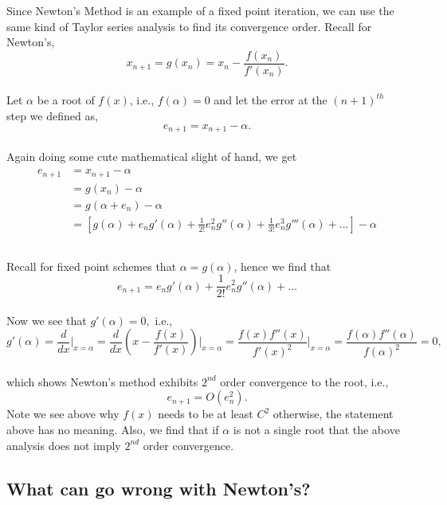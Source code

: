 \documentclass[paper=a4, fontsize=11pt]{scrartcl} %
\numberwithin{equation}{section} %
\numberwithin{figure}{section} %
\numberwithin{table}{section} %
\begin{document}
Since Newton's Method is an example of a fixed point iteration, we can use the same kind of Taylor series analysis to find its convergence order. Recall for Newton's, \\

$$x_{n+1} = g(x_n) = x_n - \frac{ f(x_n) }{ f'(x_n) }.$$\\

Let $\alpha$ be a root of $f(x)$, i.e., $f(\alpha)=0$ and let the error at the $(n+1)^{th}$ step we defined as, $$e_{n+1} = x_{n+1} - \alpha.$$\\
Again doing some cute mathematical slight of hand, we get\\

\begin{align} 
\nonumber
\begin{split}
e_{n+1}&= x_{n+1} - \alpha \\
&= g(x_n) - \alpha \\
&=g(\alpha + e_n)  - \alpha \\
&=[g(\alpha) + e_n g'(\alpha) + \frac{1}{2!} e_n^2 g''(\alpha) + \frac{1}{3!} e_n^3 g'''(\alpha) + ... ] - \alpha \\
\end{split}					
\end{align}\\

Recall for fixed point schemes that $\alpha = g(\alpha)$, hence we find that \\

$$e_{n+1} = e_n g'(\alpha)  + \frac{1}{2!} e_n^2 g''(\alpha) + ... $$\\

Now we see that $g'(\alpha)=0,$ i.e.,\\

$$g'(\alpha) = \frac{d}{dx}\Bigg|_{x=\alpha} = \frac{d}{dx} \left( x - \frac{ f(x) }{ f'(x) } \right)\Bigg|_{x=\alpha} = \frac{ f(x) f''(x) }{ f'(x)^2 } \Bigg|_{x=\alpha} = \frac{ f(\alpha) f''(\alpha) }{ f(\alpha)^2 } = 0,$$\\

which shows Newton's method exhibits $2^{nd}$ order convergence to the root, i.e., $$e_{n+1} = O(e_n^2).$$ Note we see above why $f(x)$ needs to be at least $C^2$ otherwise, the statement above has no meaning. Also, we find that if $\alpha$ is not a single root that the above analysis does not imply $2^{nd}$ order convergence. \\

\subsection{What can go wrong with Newton's?}
\end{document}
